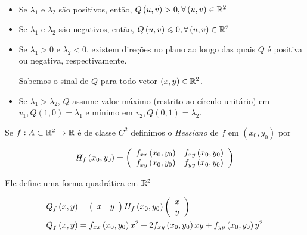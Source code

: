 \documentclass{book}
\begin{document}
\

\begin{itemize}
  \item Se $\lambda _1$ e $\lambda _2$ s\~ao positivos, ent\~ao, $Q\left( {u,v} \right) > 0,\forall \left( {u,v} \right) \in \mathbb{R}^2$
  \item Se $\lambda _1$ e $\lambda _2$ s\~ao negativos, ent\~ao, $Q\left( {u,v} \right) \leqslant 0,\forall \left( {u,v} \right) \in \mathbb{R}^2$
  \item Se $\lambda _1 > 0$ e $\lambda _2 < 0$, existem dire\c c\~oes no plano ao longo das quais $Q$ \'e positiva ou negativa, respectivamente.

Sabemos o sinal de $Q$ para todo vetor $\left( {x,y} \right) \in \mathbb{R}^2$.
  \item Se $\lambda _1 > \lambda _2$, $Q$ assume valor m\'aximo (restrito ao c\'irculo unit\'ario) em \\
$v_1 ,Q\left( {1,0} \right) = \lambda _1$ e m\'inimo em $v_2 ,Q\left( {0,1} \right) = \lambda _2$.
\end{itemize}


\begin{defn}[Hessiano]
    Se $f:A \subset \mathbb{R}^2 \to \mathbb{R}$ \'e de classe $C^2$ definimos o \textit{Hessiano} de $f$ em $\left( {x_0 ,y_0 } \right)$ por

\[
H_f \left( {x_0 ,y_0 } \right) = \left( {\begin{array}{*{20}c}
{f_{xx} \left( {x_0 ,y_0 } \right)} & {f_{xy} \left( {x_0 ,y_0 } \right)}  \\
{f_{xy} \left( {x_0 ,y_0 } \right)} & {f_{yy} \left( {x_0 ,y_0 } \right)}  \\

\end{array} } \right)
\]

\end{defn}

Ele define uma forma quadr\'atica em $\mathbb{R}^2$

\[
\begin{gathered}
Q_f \left( {x,y} \right) = \left( {\begin{array}{*{20}c}
x & y  \\

\end{array} } \right)H_f \left( {x_0 ,y_0 } \right)\left( {\begin{array}{*{20}c}
x  \\
y  \\

\end{array} } \right) \hfill \\
  Q_f \left( {x,y} \right) = f_{xx} \left( {x_0 ,y_0 } \right)x^2  + 2f_{xy} \left( {x_0 ,y_0 } \right)xy + f_{yy} \left( {x_0 ,y_0 } \right)y^2  \hfill \\
\end{gathered}
\]
\end{document}
